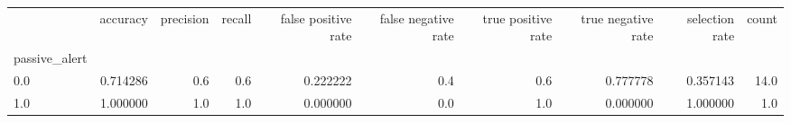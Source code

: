 \begin{tabular}{lrrrrrrrrr}
\toprule
{} &  accuracy &  precision &  recall &  false positive rate &  false negative rate &  true positive rate &  true negative rate &  selection rate &  count \\
passive\_alert &           &            &         &                      &                      &                     &                     &                 &        \\
\midrule
0.0           &  0.714286 &        0.6 &     0.6 &             0.222222 &                  0.4 &                 0.6 &            0.777778 &        0.357143 &   14.0 \\
1.0           &  1.000000 &        1.0 &     1.0 &             0.000000 &                  0.0 &                 1.0 &            0.000000 &        1.000000 &    1.0 \\
\bottomrule
\end{tabular}
